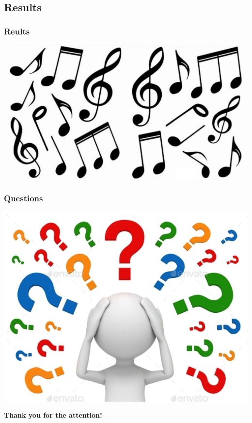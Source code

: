 \documentclass[12pt]{beamer}
\begin{document}
            \subsection{Results}
            \begin{frame}
                \frametitle{Reults}
                \includegraphics[scale=0.3]{notes}
            \end{frame}
            \begin{frame}
                \frametitle{Questions}
                \begin{center}
                    \includegraphics[scale=0.5]{questions}
                \end{center}
            \end{frame}
            \begin{frame}
                \begin{center}
                    {\LARGE \textbf{Thank you for the attention!}}
                \end{center}
            \end{frame}
\end{document}
